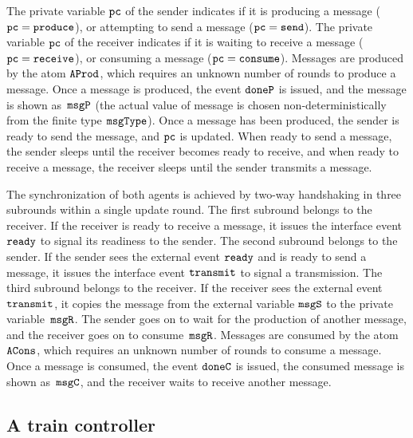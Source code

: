 {%

\mypar
The private variable $\mbox{\tt pc}$ of the sender indicates if it is producing a
message ($\mbox{\tt pc}=\mbox{\tt produce}$), or attempting to send a message
($\mbox{\tt pc}=\mbox{\tt send}$).
The private variable $\mbox{\tt pc}$ of the receiver indicates if it is waiting to
receive a message ($\mbox{\tt pc}=\mbox{\tt receive}$), or consuming a message
($\mbox{\tt pc}=\mbox{\tt consume}$).
Messages are produced by the atom $\mbox{\tt AProd}$, which requires an unknown number
of rounds to produce a message.
Once a message is produced, the event $\mbox{\tt doneP}$ is issued, and the message is
shown as~$\mbox{\tt msgP}$
(the actual value of message is chosen non-deterministically from the finite
type $\mbox{\tt msgType}$).
Once a message has been produced, the sender is ready to send the message,
and $\mbox{\tt pc}$ is updated.
When ready to send a message, the sender sleeps until the receiver becomes
ready to receive, and when ready to receive a message, the receiver sleeps
until the sender transmits a message.

\mypar
The synchronization of both agents is achieved by two-way handshaking in
three subrounds within a single update round.
The first subround belongs to the receiver.
If the receiver is ready to receive a message, it issues the interface event
$\mbox{\tt ready}$ to signal its readiness to the sender.
The second subround belongs to the sender.
If the sender sees the external event $\mbox{\tt ready}$ and is ready to send a
message, it issues the interface event $\mbox{\tt transmit}$ to signal a transmission.
The third subround belongs to the receiver.
If the receiver sees the external event $\mbox{\tt transmit}$, it copies the message
from the external variable $\mbox{\tt msgS}$ to the private variable~$\mbox{\tt msgR}$.
The sender goes on to wait for the production of another message, and the
receiver goes on to consume~$\mbox{\tt msgR}$.
Messages are consumed by the atom $\mbox{\tt ACons}$, which requires an unknown number
of rounds to consume a message.
Once a message is consumed, the event $\mbox{\tt doneC}$ is issued, the consumed
message is shown as~$\mbox{\tt msgC}$, and the receiver waits to receive another
message.

\subsection{A train controller}
\label{subsec:train}

}
